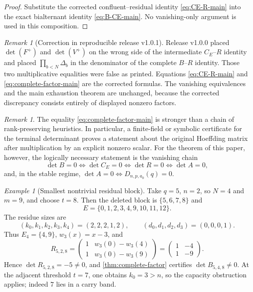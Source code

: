 \documentclass[11pt]{amsart}
\newcommand{\1}{\mathbf 1}
\theoremstyle{remark}
\newtheorem{remark}[theorem]{Remark}
\newtheorem{example}[theorem]{Example}
\begin{document}
\begin{proof}
Substitute the corrected confluent--residual identity \eqref{eq:CE-R-main} into the exact bialternant identity \eqref{eq:B-CE-main}. No vanishing-only argument is used in this composition.
\end{proof}

\begin{remark}[Correction in reproducible release v1.0.1]\label{rem:v101-correction}
Release v1.0.0 placed $\det(F^+)$ and $\det(V^+)$ on the wrong side of the intermediate $C_E$--$R$ identity and placed $\prod_{b<N}\Delta_b$ in the denominator of the complete $B$--$R$ identity. Those two multiplicative equalities were false as printed. Equations \eqref{eq:CE-R-main} and \eqref{eq:complete-factor-main} are the corrected formulas. The vanishing equivalences and the main exhaustion theorem are unchanged, because the corrected discrepancy consists entirely of displayed nonzero factors.
\end{remark}

\begin{remark}
The equality \eqref{eq:complete-factor-main} is stronger than a chain of rank-preserving heuristics. In particular, a finite-field or symbolic certificate for the terminal determinant proves a statement about the original Hoeffding matrix after multiplication by an explicit nonzero scalar. For the theorem of this paper, however, the logically necessary statement is the vanishing chain
\[
 \det B=0\Longleftrightarrow\det C_E=0
 \Longleftrightarrow\det R=0
 \Longleftrightarrow\det A=0,
\]
and, in the stable regime, $\det A=0\Longleftrightarrow D_{n,p,a_0}(q)=0$.
\end{remark}


\begin{example}[Smallest nontrivial residual block]\label{ex:small-residual}
Take $q=5$, $n=2$, so $N=4$ and $m=9$, and choose $t=8$. Then the deleted block is $\{5,6,7,8\}$ and
\[
 E=\{0,1,2,3,4,9,10,11,12\}.
\]
The residue sizes are
\[
 (k_0,k_1,k_2,k_3,k_4)=(2,2,2,1,2),
 \qquad(d_0,d_1,d_2,d_3)=(0,0,0,1).
\]
Thus $E_4=\{4,9\}$, $w_3(x)=x-3$, and
\[
 R_{5,2,8}=
 \begin{pmatrix}
 1&w_3(0)-w_3(4)\\
 1&w_3(0)-w_3(9)
 \end{pmatrix}
 =\begin{pmatrix}1&-4\\1&-9\end{pmatrix}.
\]
Hence $\det R_{5,2,8}=-5\ne0$, and \cref{thm:complete-factor} certifies $\det B_{5,4,8}\ne0$. At the adjacent threshold $t=7$, one obtains $k_0=3>n$, so the capacity obstruction applies; indeed $7$ lies in a carry band.
\end{example}
\end{document}
